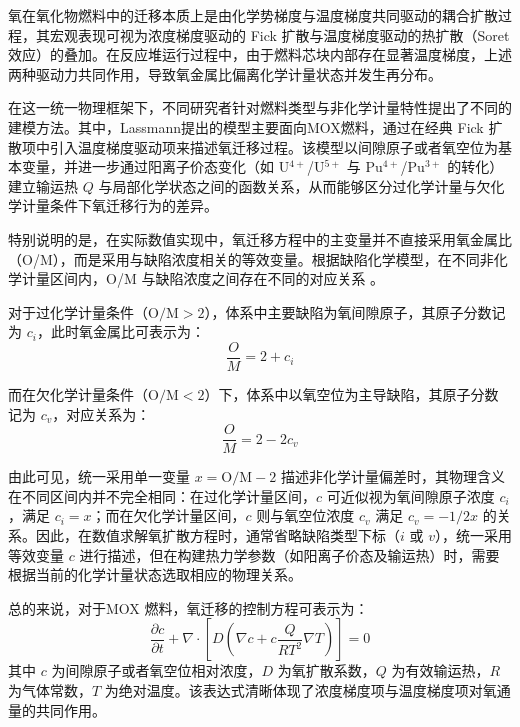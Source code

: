 
氧在氧化物燃料中的迁移本质上是由化学势梯度与温度梯度共同驱动的耦合扩散过程，其宏观表现可视为浓度梯度驱动的 Fick 扩散与温度梯度驱动的热扩散（Soret 效应）的叠加。在反应堆运行过程中，由于燃料芯块内部存在显著温度梯度，上述两种驱动力共同作用，导致氧金属比偏离化学计量状态并发生再分布。

在这一统一物理框架下，不同研究者针对燃料类型与非化学计量特性提出了不同的建模方法。其中，Lassmann\cite{lassmannOxiredModelRedistribution1987}提出的模型主要面向MOX燃料，通过在经典 Fick 扩散项中引入温度梯度驱动项来描述氧迁移过程。该模型以间隙原子或者氧空位为基本变量，并进一步通过阳离子价态变化（如 U$^{4+}$/U$^{5+}$ 与 Pu$^{4+}$/Pu$^{3+}$ 的转化）建立输运热 $Q$ 与局部化学状态之间的函数关系，从而能够区分过化学计量与欠化学计量条件下氧迁移行为的差异。

特别说明的是，在实际数值实现中，氧迁移方程中的主变量并不直接采用氧金属比（O/M），而是采用与缺陷浓度相关的等效变量。根据缺陷化学模型，在不同非化学计量区间内，O/M 与缺陷浓度之间存在不同的对应关系 \cite{lassmannOxiredModelRedistribution1987}。

对于过化学计量条件（$ \mathrm{O/M} > 2 $），体系中主要缺陷为氧间隙原子，其原子分数记为 $c_i$，此时氧金属比可表示为：
\begin{equation}
	\frac{O}{M} = 2 + c_i
\end{equation}

而在欠化学计量条件（$ \mathrm{O/M} < 2 $）下，体系中以氧空位为主导缺陷，其原子分数记为 $c_v$，对应关系为：
\begin{equation}
	\frac{O}{M} = 2 - 2c_v
\end{equation}

由此可见，统一采用单一变量 $x=\mathrm{O/M}-2$ 描述非化学计量偏差时，其物理含义在不同区间内并不完全相同：在过化学计量区间，$c$ 可近似视为氧间隙原子浓度 $c_i$，满足 $c_i = x$；而在欠化学计量区间，$c$ 则与氧空位浓度 $c_v$ 满足 $c_v=-1/2x$ 的关系。因此，在数值求解氧扩散方程时，通常省略缺陷类型下标（$i$ 或 $v$），统一采用等效变量 $c$ 进行描述，但在构建热力学参数（如阳离子价态及输运热）时，需要根据当前的化学计量状态选取相应的物理关系。

总的来说，对于MOX 燃料，氧迁移的控制方程可表示为：
\begin{equation}
	\frac{\partial c}{\partial t} + \nabla \cdot \left[ D \left( \nabla c + c \frac{Q}{R T^2} \nabla T \right) \right] = 0
\end{equation}
其中 $c$ 为间隙原子或者氧空位相对浓度，$D$ 为氧扩散系数，$Q$ 为有效输运热，$R$ 为气体常数，$T$ 为绝对温度。该表达式清晰体现了浓度梯度项与温度梯度项对氧通量的共同作用。

